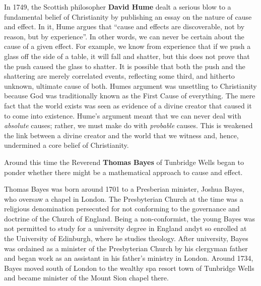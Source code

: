 \documentclass[a4paper,11pt]{apa7}
\begin{document}
In 1749, the Scottish philosopher \textbf{David Hume} dealt a serious blow to a fundamental belief of Christianity by publishing an essay on the nature of cause and effect. In it, Hume argues that ``cause and effects are discoverable, not by reason, but by experience''. In other words, we can never be certain about the cause of a given effect. For example, we know from experience that if we push a glass off the side of a table, it will fall and shatter, but this does not prove that the push caused the glass to shatter. It is possible that both the push and the shattering are merely correlated events, reflecting some third, and hitherto  unknown, ultimate cause of both. Humes argument was unsettling to Christianity because God was traditionally known as the First Cause of everything. The mere fact that the world exists was seen as evidence of a divine creator that caused it to come into existence. Hume's argument meant that we can never deal with \emph{absolute} causes; rather, we must make do with \emph{probable} causes. This is weakened the link between a divine creator and the world that we witness and, hence, undermined a core belief of Christianity.

Around this time the Reverend \textbf{Thomas Bayes} of Tunbridge Wells began to ponder whether there might be a mathematical approach to cause and effect.

Thomas Bayes was born around 1701 to a Presberian minister, Joshua Bayes, who oversaw a chapel in London. The Presbyterian Church at the time was a religious denomination persecuted for not conforming to the governance and doctrine of the Church of England. Being a non-conformist, the young Bayes was not permitted to study for a university degree in England andyt so enrolled at the University of Edinburgh, where he studies theology. After university, Bayes was ordained as a minister of the Presbyterian Church by his clergyman father and began work as an assistant in his father's ministry in London. Around 1734, Bayes moved south of London to the wealthy spa resort town of Tunbridge Wells and became minister of the Mount Sion chapel there.
\end{document}
